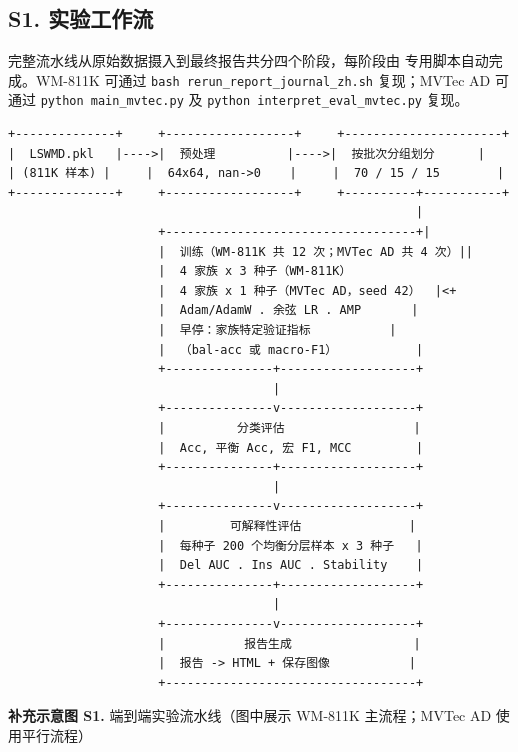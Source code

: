 \documentclass[11pt,a4paper]{article}
\begin{document}
\subsection*{S1. 实验工作流}

完整流水线从原始数据摄入到最终报告共分四个阶段，每阶段由 专用脚本自动完成。WM-811K 可通过 \texttt{bash rerun\_report\_journal\_zh.sh} 复现；MVTec AD 可通过 \texttt{python main\_mvtec.py} 及 \texttt{python interpret\_eval\_mvtec.py} 复现。

\begin{Verbatim}
+--------------+     +------------------+     +----------------------+
|  LSWMD.pkl   |---->|  预处理          |---->|  按批次分组划分      |
| (811K 样本) |     |  64x64, nan->0    |     |  70 / 15 / 15        |
+--------------+     +------------------+     +----------+-----------+
                                                         |
                     +-----------------------------------+|
                     |  训练（WM-811K 共 12 次；MVTec AD 共 4 次）||
                     |  4 家族 x 3 种子（WM-811K）
                     |  4 家族 x 1 种子（MVTec AD，seed 42）  |<+
                     |  Adam/AdamW . 余弦 LR . AMP       |
                     |  早停：家族特定验证指标           |
                     |  （bal-acc 或 macro-F1）           |
                     +---------------+-------------------+
                                     |
                     +---------------v-------------------+
                     |          分类评估                  |
                     |  Acc, 平衡 Acc, 宏 F1, MCC         |
                     +---------------+-------------------+
                                     |
                     +---------------v-------------------+
                     |         可解释性评估               |
                     |  每种子 200 个均衡分层样本 x 3 种子   |
                     |  Del AUC . Ins AUC . Stability    |
                     +---------------+-------------------+
                                     |
                     +---------------v-------------------+
                     |           报告生成                 |
                     |  报告 -> HTML + 保存图像           |
                     +-----------------------------------+
\end{Verbatim}

\begin{center}
\small \textbf{补充示意图 S1.} 端到端实验流水线（图中展示 WM-811K 主流程；MVTec AD 使用平行流程）
\end{center}
\end{document}
